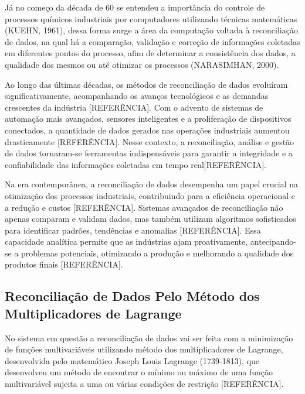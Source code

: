 Já no começo da década de 60 se entendeu a importância do controle de processos químicos industriais por computadores utilizando técnicas matemáticas (KUEHN, 1961), dessa forma surge a área da computação voltada à reconciliação de dados, na qual há a comparação, validação e correção de informações coletadas em diferentes pontos do processo, afim de determinar a consistência dos dados, a qualidade dos mesmos ou até otimizar os processos (NARASIMHAN, 2000).

Ao longo das últimas décadas, os métodos de reconciliação de dados evoluíram significativamente, acompanhando os avanços tecnológicos e as demandas crescentes da indústria [REFERÊNCIA]. Com o advento de sistemas de automação mais avançados, sensores inteligentes e a proliferação de dispositivos conectados, a quantidade de dados gerados nas operações industriais aumentou drasticamente [REFERÊNCIA]. Nesse contexto, a reconciliação, análise e gestão de dados tornaram-se ferramentas indispensáveis para garantir a integridade e a confiabilidade das informações coletadas em tempo real[REFERÊNCIA].

Na era contemporânea, a reconciliação de dados desempenha um papel crucial na otimização dos processos industriais, contribuindo para a eficiência operacional e a redução e custos [REFERÊNCIA]. Sistemas avançados de reconciliação não apenas comparam e validam dados, mas também utilizam algoritmos sofisticados para identificar padrões, tendências e anomalias [REFERÊNCIA]. Essa capacidade analítica permite que as indústrias ajam proativamente, antecipando-se a problemas potenciais, otimizando a produção e melhorando a qualidade dos produtos finais [REFERÊNCIA].

\subsection{Reconciliação de Dados Pelo Método dos Multiplicadores de Lagrange}

No sistema em questão a reconciliação de dados vai ser feita com a minimização de funções multivariáveis utilizando método dos multiplicadores de Lagrange, desenvolvida pelo matemático Joseph Louis Lagrange (1739-1813), que desenvolveu um método de encontrar o mínimo ou máximo de uma função multivariável sujeita a uma ou várias condições de restrição [REFERÊNCIA].

